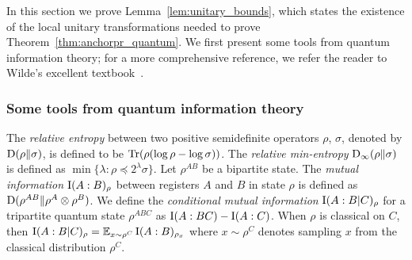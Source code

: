 In this section we prove Lemma~\ref{lem:unitary_bounds}, which states the existence of the local unitary transformations needed to prove Theorem~\ref{thm:anchorpr_quantum}. We first present some tools from quantum information theory; for a more comprehensive reference, we refer the reader to Wilde's excellent textbook~\cite{wilde2013quantum}.

\subsubsection{Some tools from quantum information theory}

The \emph{relative entropy} between two positive semidefinite operators $\rho$, $\sigma$, denoted by $\mathrm{D}(\rho \| \sigma)$, is defined to be $\mbox{\rm Tr}(\rho (\log \rho - \log \sigma))$. The \emph{relative min-entropy} $\mathrm{D}_\infty(\rho \| \sigma)$ is defined as $\min\{ \lambda : \rho \preceq 2^\lambda \sigma \}$. Let $\rho^{AB}$ be a bipartite state. The \emph{mutual information} $\mathrm{I}(A:B)_\rho$ between registers $A$ and $B$ in state $\rho$ is defined as $\mathrm{D}(\rho^{AB} \| \rho^A \otimes \rho^B)$. We define the \emph{conditional mutual information} $\mathrm{I}(A:B|C)_\rho$ for a tripartite quantum state $\rho^{ABC}$ as $\mathrm{I}(A:BC) - \mathrm{I}(A:C)$. When $\rho$ is classical on $C$, then $\mathrm{I}(A:B|C)_\rho = \operatorname*{\mathbb{E}}_{x \sim \rho^C} \mathrm{I}(A:B)_{\rho_x}$ where $x \sim \rho^C$ denotes sampling $x$ from the classical distribution $\rho^C$.




